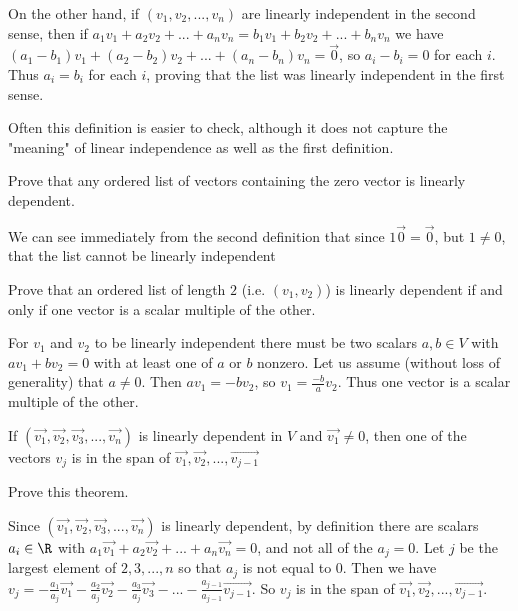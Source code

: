 \begin{Basis and Dimension}
\begin{free-response}
	On the other hand, if $(v_1,v_2,...,v_n)$ are linearly independent in the second sense, then if $a_1v_1+a_2v_2 + ...+a_nv_n = b_1v_1 + b_2v_2 + ... + b_nv_n$ we have
	$(a_1-b_1)v_1+(a_2-b_2)v_2+...+(a_n-b_n)v_n = \vec{0}$, so $a_i-b_i=0$ for each $i$.  Thus $a_i=b_i$ for each $i$, proving that the list was linearly independent 
	in the first sense.
 \end{free-response}
 
  	Often this definition is easier to check, although it does not capture the "meaning" of linear independence as well as the first definition.

 
 	Prove that any ordered list of vectors containing the zero vector is linearly dependent. 
	\begin{free-response}
		We can see immediately from the second definition that since $1\vec{0} = \vec{0}$, but $1\neq 0$, that the list cannot be linearly independent
	\end{free-response}
 
 	Prove that an ordered list of length $2$ (i.e. $(v_1,v_2)$) is linearly dependent if and only if one vector is a scalar multiple of the other.
	\begin{free-response}
		For $v_1$ and $v_2$ to be linearly independent there must be two scalars $a,b \in V$ with $av_1+bv_2=0$ with at least one of $a$ or $b$ nonzero.
		Let us assume (without loss of generality) that $a \neq 0$.  Then $av_1=-bv_2$, so $v_1=\frac{-b}{a}v_2$.  Thus one vector is a scalar multiple of the other.	
	
		\end{free-response}


 \begin{theorem}
 	If $(\vec{v_1},\vec{v_2},\vec{v_3}, ..., \vec{v_n})$ is linearly dependent in $V$ and $\vec{v_1} \neq 0$, then one of the vectors $v_j$ is in the 
 	span of $\vec{v_1},\vec{v_2},...,\vec{v_{j-1}}$
 \end{theorem}
 
Prove this theorem.

\begin{free-response}
 	Since $(\vec{v_1},\vec{v_2},\vec{v_3}, ..., \vec{v_n})$ is linearly dependent, by definition there are scalars $a_i \in \R$ with 
 	$a_1\vec{v_1}+a_2\vec{v_2}+ ...+a_n\vec{v_n} = 0$, and not all of the $a_j =0$.  Let $j$ be the largest element of ${2,3,...,n}$ so that $a_j$ is not equal to $0$.
 	Then we have 
 	$v_j = -\frac{a_1}{a_j}\vec{v_1}-\frac{a_2}{a_j}\vec{v_2} -\frac{a_3}{a_j}\vec{v_3} - ...-\frac{a_{j-1}}{a_{j-1}}\vec{v_{j-1}}$.
 	So $v_j$ is in the span of $\vec{v_1},\vec{v_2},...,\vec{v_{j-1}}$.
 \end{free-response}
 

\end{Basis and Dimension}
